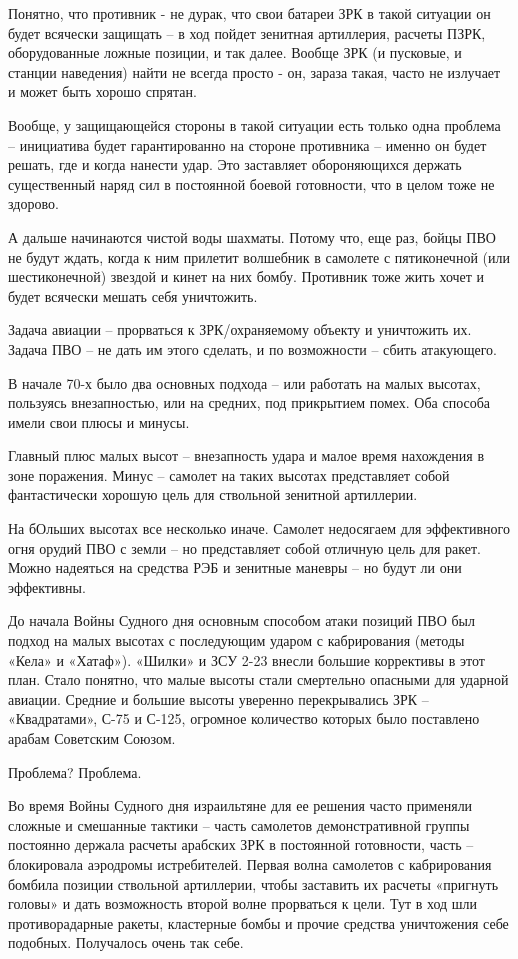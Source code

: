 Понятно, что противник - не дурак, что свои батареи ЗРК в такой ситуации он будет всячески защищать – в ход пойдет зенитная артиллерия, расчеты ПЗРК, оборудованные ложные позиции, и так далее. Вообще ЗРК (и пусковые, и станции наведения) найти не всегда просто - он, зараза такая, часто не излучает и может быть хорошо спрятан.

Вообще, у защищающейся стороны в такой ситуации есть только одна проблема – инициатива будет гарантированно на стороне противника – именно он будет решать, где и когда нанести удар. Это заставляет обороняющихся держать существенный наряд сил в постоянной боевой готовности, что в целом тоже не здорово.

А дальше начинаются чистой воды шахматы. Потому что, еще раз, бойцы ПВО не будут ждать, когда к ним прилетит волшебник в самолете с пятиконечной (или шестиконечной) звездой и кинет на них бомбу. Противник тоже жить хочет и будет всячески мешать себя уничтожить.

Задача авиации – прорваться к ЗРК/охраняемому объекту и уничтожить их. Задача ПВО – не дать им этого сделать, и по возможности – сбить атакующего.

В начале 70-х было два основных подхода – или работать на малых высотах, пользуясь внезапностью, или на средних, под прикрытием помех. Оба способа имели свои плюсы и минусы.

Главный плюс малых высот – внезапность удара и малое время нахождения в зоне поражения. Минус – самолет на таких высотах представляет собой фантастически хорошую цель для ствольной зенитной артиллерии.

На бОльших высотах все несколько иначе. Самолет недосягаем для эффективного огня орудий ПВО с земли – но представляет собой отличную цель для ракет. Можно надеяться на средства РЭБ и зенитные маневры – но будут ли они эффективны.

До начала Войны Судного дня основным способом атаки позиций ПВО был подход на малых высотах с последующим ударом с кабрирования (методы «Кела» и «Хатаф»). «Шилки» и ЗСУ 2-23 внесли большие коррективы в этот план. Стало понятно, что малые высоты стали смертельно опасными для ударной авиации. Средние и большие высоты уверенно перекрывались ЗРК – «Квадратами», С-75 и С-125, огромное количество которых было поставлено арабам Советским Союзом.

Проблема? Проблема.

Во время Войны Судного дня израильтяне для ее решения часто применяли сложные и смешанные тактики – часть самолетов демонстративной группы постоянно держала расчеты арабских ЗРК в постоянной готовности, часть – блокировала аэродромы истребителей. Первая волна самолетов с кабрирования бомбила позиции ствольной артиллерии, чтобы заставить их расчеты «пригнуть головы» и дать возможность второй волне прорваться к цели. Тут в ход шли противорадарные ракеты, кластерные бомбы и прочие средства уничтожения себе подобных.
Получалось очень так себе.

